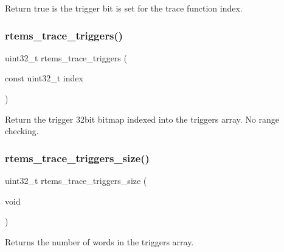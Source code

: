 Return true is the trigger bit is set for the trace function index. \mbox{\label{rtems-trace-buffer-vars_8h_a7b1bdbe3472f3d0c49f7c9ce5edfba27}} 
\subsubsection{\texorpdfstring{rtems\_trace\_triggers()}{rtems\_trace\_triggers()}}
{\footnotesize\ttfamily uint32\+\_\+t rtems\+\_\+trace\+\_\+triggers (\begin{DoxyParamCaption}\item[{const uint32\+\_\+t}]{index }\end{DoxyParamCaption})}

Return the trigger 32bit bitmap indexed into the triggers array. No range checking. \mbox{\label{rtems-trace-buffer-vars_8h_ae0f205d7d7f5021bf32c3eb7a9e62560}} 
\subsubsection{\texorpdfstring{rtems\_trace\_triggers\_size()}{rtems\_trace\_triggers\_size()}}
{\footnotesize\ttfamily uint32\+\_\+t rtems\+\_\+trace\+\_\+triggers\+\_\+size (\begin{DoxyParamCaption}\item[{void}]{ }\end{DoxyParamCaption})}

Returns the number of words in the triggers array. 